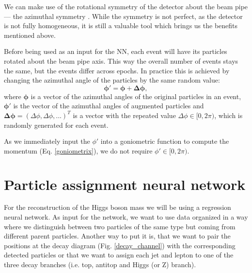 \documentclass{ctuthesis}
\begin{document}
We can make use of the rotational symmetry of the detector about the beam pipe — the azimuthal symmetry \cite{symmetry}. While the symmetry is not perfect, as the detector is not fully homogeneous, it is still a valuable tool which brings us the benefits mentioned above.

\begin{figure}[h]
\end{figure}

Before being used as an input for the NN, each event will have its particles rotated about the beam pipe axis. This way the overall number of events stays the same, but the events differ across epochs. In practice this is achieved by changing the azimuthal angle of the particles by the same random value:
\begin{equation}
    \bm{\phi}' =  \bm{\phi}+\bm{\Delta\phi},
\end{equation}
where $\bm{\phi}$ is a vector of the azimuthal angles of the original particles in an event, $\bm{\phi}'$ is the vector of the azimuthal angles of augmented particles and $\bm{\Delta\phi} = (\Delta\phi,\Delta\phi,...)^T$ is a vector with the repeated value $\Delta\phi \in [0,2\pi)$, which is randomly generated for each event.

As we immediately input the $\phi'$ into a goniometric function to compute the momentum (Eq. \ref{goniometrix}), we do not require $\phi' \in [0,2\pi)$.

\section{Particle assignment neural network}
\label{sec:p_a_big}
For the reconstruction of the Higgs boson mass we will be using a regression neural network. As input for the network, we want to use data organized in a way where we distinguish between two particles of the same type but coming from different parent particles. Another way to put it is, that we want to pair the positions at the decay diagram (Fig. \ref{decay_channel}) with the corresponding detected particles or that we want to assign each jet and lepton to one of the three decay branches (i.e. top, antitop and Higgs (or Z) branch).
\end{document}
